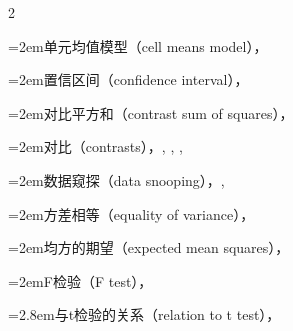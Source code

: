 \begin{multicols}{2}
\par\noindent\hangindent=2em\hspace*{1em}\label{idx:29}单元均值模型（cell means model），\hyperref[idxocc:29:454]{\pageref*{idxocc:29:454}}\par
\par\noindent\hangindent=2em\hspace*{1em}\label{idx:30}置信区间（confidence interval），\hyperref[eq:11.2.8]{\pageref*{eq:11.2.8}}\par
\par\noindent\hangindent=2em\hspace*{1em}\label{idx:31}对比平方和（contrast sum of squares），\hyperref[eq:11.2.18]{\pageref*{eq:11.2.18}}\par
\par\noindent\hangindent=2em\hspace*{1em}\label{idx:32}对比（contrasts），\hyperref[def:11.2.4]{\pageref*{def:11.2.4}}, \hyperref[ex:11.2.6]{\pageref*{ex:11.2.6}}, \hyperref[idxocc:32:459]{\pageref*{idxocc:32:459}}, \hyperref[sec:11.2.5]{\pageref*{sec:11.2.5}}\par
\par\noindent\hangindent=2em\hspace*{1em}\label{idx:33}数据窥探（data snooping），\hyperref[idxocc:33:464]{\pageref*{idxocc:33:464}}, \hyperref[exercise:11.18]{\pageref*{exercise:11.18}}\par
\par\noindent\hangindent=2em\hspace*{1em}\label{idx:34}方差相等（equality of variance），\hyperref[item:11.2.assumption.iii]{\pageref*{item:11.2.assumption.iii}}\par
\par\noindent\hangindent=2em\hspace*{1em}\label{idx:35}均方的期望（expected mean squares），\hyperref[exercise:11.22]{\pageref*{exercise:11.22}}\par
\par\noindent\hangindent=2em\hspace*{1em}\label{idx:36}F检验（F test），\hyperref[eq:11.2.14]{\pageref*{eq:11.2.14}}\par
\par\noindent\hangindent=2.8em\hspace*{1.8em}\label{idx:37}与t检验的关系（relation to t test），\hyperref[exercise:11.12]{\pageref*{exercise:11.12}}\par

\end{multicols}

